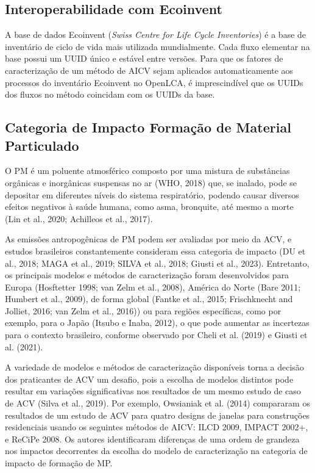\subsection{Interoperabilidade com Ecoinvent}

A base de dados Ecoinvent (\textit{Swiss Centre for Life Cycle Inventories}) \'e a base de invent\'ario de ciclo de vida mais utilizada mundialmente. Cada fluxo elementar na base possui um UUID \'unico e est\'avel entre vers\~oes. Para que os fatores de caracteriza\c{c}\~ao de um m\'etodo de AICV sejam aplicados automaticamente aos processos do invent\'ario Ecoinvent no OpenLCA, \'e imprescind\'ivel que os UUIDs dos fluxos no m\'etodo coincidam com os UUIDs da base.

\subsection{Categoria de Impacto Formação de Material Particulado}

O PM é um poluente atmosférico composto por uma mistura de substâncias orgânicas e inorgânicas suspensas no ar (WHO, 2018) que, se inalado, pode se depositar em diferentes níveis do sistema respiratório, podendo causar diversos efeitos negativos à saúde humana, como asma, bronquite, até mesmo a morte (Lin et al., 2020; Achilleos et al., 2017).

As emissões antropogênicas de PM podem ser avaliadas por meio da ACV, e estudos brasileiros constantemente consideram essa categoria de impacto (DU et al., 2018; MAGA et al., 2019; SILVA et al., 2018; Giusti et al., 2023). Entretanto, os principais modelos e métodos de caracterização foram desenvolvidos para Europa (Hosftetter 1998; van Zelm et al., 2008), América do Norte (Bare 2011; Humbert et al., 2009), de forma global (Fantke et al., 2015; Frischknecht and Jolliet, 2016; van Zelm et al., 2016)) ou para regiões específicas, como por exemplo, para o Japão (Itsubo e Inaba, 2012), o que pode aumentar as incertezas para o contexto brasileiro, conforme observado por Cheli et al. (2019) e Giusti et al. (2021).

A variedade de modelos e métodos de caracterização disponíveis torna a decisão dos praticantes de ACV um desafio, pois a escolha de modelos distintos pode resultar em variações significativas nos resultados de um mesmo estudo de caso de ACV (Silva et al., 2019). Por exemplo, Owsianiak et al. (2014) compararam os resultados de um estudo de ACV para quatro designs de janelas para construções residenciais usando os seguintes métodos de AICV: ILCD 2009, IMPACT 2002+, e ReCiPe 2008. Os autores identificaram diferenças de uma ordem de grandeza nos impactos decorrentes da escolha do modelo de caracterização na categoria de impacto de formação de MP.

